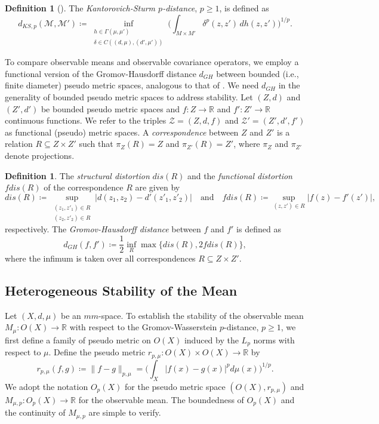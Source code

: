\documentclass[11pt]{article}
\theoremstyle{definition}
\newtheorem{definition}[theorem]{Definition}
\newcommand{\real}{\ensuremath{\mathbb{R}}}
\newcommand{\obs}[1]{\ensuremath{O(#1)}}
\newcommand{\obsp}[1]{\ensuremath{O_p(#1)}}
\newcommand{\meanp}[1]{\ensuremath{M_{#1,p}}}
\newcommand{\dks}{\ensuremath{d_{KS,p}}}
\newcommand{\dgh}{\ensuremath{d_{GH}}}
\newcommand{\dlp}[1]{\ensuremath{r_{p,#1}}}
\newcommand{\mm}[1]{\ensuremath{\mathcal{#1}}}
\begin{document}
\begin{definition}[\cite{sturm2006}] \label{D:dks}
The {\em Kantorovich-Sturm $p$-distance}, $p \geq 1$, is defined as
\[
\dks (\mm{M},\mm{M}') \coloneq \inf_{\substack{h \in \Gamma(\mu,\mu')\\ \delta \in C((d,\mu),(d',\mu'))}} \Big( \int_{M \times M'} \delta^p (z,z') \,dh (z,z') \Big)^{1/p}.
\]
\end{definition}

To compare observable means and observable covariance operators, we employ a functional version of the Gromov-Hausdorff distance $\dgh$ between bounded (i.e., finite diameter) pseudo metric spaces, analogous to that of \cite{curry2024,anbouhi2024}. We need $\dgh$ in the generality of bounded pseudo metric spaces to address stability. Let $(Z,d)$ and $(Z',d')$ be bounded pseudo metric spaces and $f \colon Z \to \real$ and $f' \colon Z' \to \real$ continuous functions. We refer to the triples $\mm{Z} = (Z,d,f)$ and $\mm{Z}' = (Z',d',f')$ as functional (pseudo) metric spaces. A {\em correspondence} between $Z$ and $Z'$ is a relation $R \subseteq Z \times Z'$ such that $\pi_Z (R) = Z$ and $\pi_{Z'} (R) = Z'$, where $\pi_Z$ and $\pi_{Z'}$ denote projections.

\begin{definition} \label{D:dgh}
The {\em structural distortion} $dis(R)$ and the {\em functional distortion} $fdis(R)$ of the correspondence $R$ are given by
\[
dis(R) \coloneq \sup_{\substack{(z_1,z'_1) \in R\\ (z_2,z'_2) \in R}} |d(z_1, z_2) - d'(z'_1,z'_2)| 
\quad \text{and} \quad
fdis(R) \coloneq \sup_{(z,z') \in R} |f(z)-f'(z')|,
\]
respectively. The {\em Gromov-Hausdorff distance} between $f$ and $f'$ is defined as
\[
\dgh (f,f') \coloneq \frac{1}{2} \inf_R \max \big\{dis (R), 2 fdis(R) \big\},
\]
where the infimum is taken over all correspondences $R \subseteq Z \times Z'$. 
\end{definition}


\subsection{Heterogeneous Stability of the Mean}

Let $(X,d,\mu)$ be an $mm$-space. To establish the stability of the observable mean $M_\mu \colon \obs{X} \to \real$ with respect to the Gromov-Wasserstein $p$-distance, $p \geq 1$, we first define a family of pseudo metric on $\obs{X}$ induced by the $L_p$ norms with respect to $\mu$. Define the pseudo metric $\dlp{\mu} \colon \obs{X} \times \obs{X} \to \real$ by
\begin{equation} \label{E:dlp}
\dlp{\mu} (f,g) \coloneq \|f-g\|_{p,\mu} = \Big(\int_X |f(x)-g(x)|^p d\mu (x)\Big)^{1/p}.
\end{equation}
We adopt the notation $\obsp{X}$ for the pseudo metric space $(\obs{X}, \dlp{\mu})$ and $\meanp{\mu} \colon \obsp{X} \to \real$ for the observable mean. The boundedness of $\obsp{X}$ and the continuity of $\meanp{\mu}$ are simple to verify.
\end{document}
